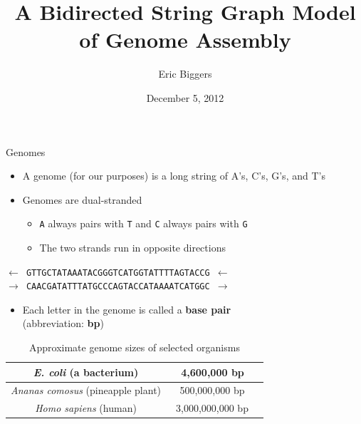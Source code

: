 \documentclass[xcolor=dvipsnames]{beamer}
\begin{document}
\title{A Bidirected String Graph Model of Genome Assembly}
\author{Eric Biggers}
\date{December 5, 2012}

\frame{\titlepage}

\begin{frame}{Genomes}
	\begin{itemize}
		\item A genome (for our purposes) is a long string of A's, C's, G's, and T's
		\item Genomes are dual-stranded
		\begin{itemize}
			\item {\tt A} always pairs with {\tt T} and {\tt C} always pairs
			with {\tt G}
			\item The two strands run in opposite directions
		\end{itemize}
	\end{itemize}
	\begin{center}
	{\tt $\leftarrow$ GTTGCTATAAATACGGGTCATGGTATTTTAGTACCG $\leftarrow$ \\}
	{\tt $\rightarrow$ CAACGATATTTATGCCCAGTACCATAAAATCATGGC $\rightarrow$}
	\end{center}
	\begin{itemize}
		\item Each letter in the genome is called a {\bf base pair} \\(abbreviation:
		{\bf bp})
	\end{itemize}
	\begin{table}[H]
		\caption{Approximate genome sizes of selected organisms}
		\begin{tabular}{|c|c|c|}
			\hline
			{\it E. coli} (a bacterium) &  ~4,600,000 bp \\
			\hline
			{\it Ananas comosus} (pineapple plant) &	~500,000,000 bp \\
			\hline
			{\it Homo sapiens} (human)       &  ~3,000,000,000 bp \\
			\hline
		\end{tabular}
	\end{table}
\end{frame}
\end{document}
